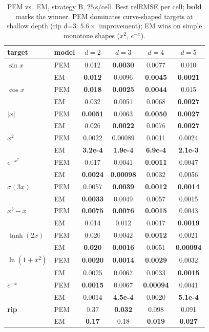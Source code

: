 \documentclass[11pt]{article}
\begin{document}
\begin{table}[h]
\centering\small
\caption{PEM vs.\ EM, strategy B, $25\,$s/cell. Best relRMSE per cell;
\textbf{bold} marks the winner. PEM dominates curve-shaped targets at
shallow depth (rip d=3: $5.6\times$ improvement); EM wins on simple
monotone shapes ($x^2$, $e^{-x}$).}
\label{tab:pem}
\begin{tabular}{llcccc}
\toprule
target & model & $d{=}2$ & $d{=}3$ & $d{=}4$ & $d{=}5$ \\
\midrule
$\sin x$    & PEM & 0.012 & \textbf{0.0030} & 0.0077 & 0.010 \\
            & EM  & \textbf{0.012} & 0.0096 & \textbf{0.0045} & \textbf{0.0021} \\
\midrule
$\cos x$    & PEM & \textbf{0.018} & \textbf{0.0025} & \textbf{0.0044} & 0.015 \\
            & EM  & 0.032 & 0.0051 & 0.0068 & \textbf{0.0027} \\
\midrule
$|x|$       & PEM & \textbf{0.0051} & 0.0063 & \textbf{0.0050} & \textbf{0.0027} \\
            & EM  & 0.026 & \textbf{0.0022} & 0.0076 & \textbf{0.0027} \\
\midrule
$x^2$       & PEM & 0.0022 & 0.00089 & 0.0011 & 0.0024 \\
            & EM  & \textbf{3.2e-4} & \textbf{1.9e-4} & \textbf{6.9e-4} & \textbf{2.1e-3} \\
\midrule
$e^{-x^2}$  & PEM & 0.017 & 0.0041 & \textbf{0.0011} & 0.0047 \\
            & EM  & \textbf{0.0024} & \textbf{0.00098} & 0.0032 & 0.0056 \\
\midrule
$\sigma(3x)$  & PEM & 0.0057 & \textbf{0.0039} & \textbf{0.0012} & \textbf{0.0014} \\
              & EM  & \textbf{0.0033} & 0.0049 & 0.0057 & 0.0015 \\
\midrule
$x^3 - x$   & PEM & \textbf{0.0075} & \textbf{0.0076} & \textbf{0.0015} & 0.0043 \\
            & EM  & 0.014 & 0.012 & 0.0017 & \textbf{0.0019} \\
\midrule
$\tanh(2x)$ & PEM & 0.020 & 0.0042 & \textbf{0.0012} & 0.0021 \\
            & EM  & \textbf{0.020} & \textbf{0.0016} & 0.0051 & \textbf{0.00094} \\
\midrule
$\ln(1+x^2)$  & PEM & \textbf{0.0020} & \textbf{0.0014} & \textbf{0.0029} & 0.0032 \\
              & EM  & 0.0025 & 0.0067 & 0.0033 & \textbf{0.0015} \\
\midrule
$e^{-x}$    & PEM & \textbf{0.0015} & 0.0067 & \textbf{0.00094} & 0.0041 \\
            & EM  & 0.0014 & \textbf{4.5e-4} & 0.0020 & \textbf{5.1e-4} \\
\midrule
\textbf{rip}  & PEM & 0.37  & \textbf{0.032} & 0.098 & 0.091 \\
              & EM  & \textbf{0.17} & 0.18 & \textbf{0.019} & \textbf{0.027} \\
\bottomrule
\end{tabular}
\end{table}
\end{document}
